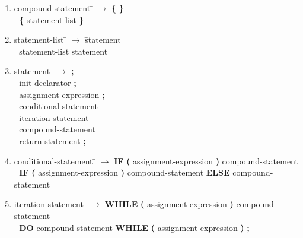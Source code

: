 \begin{enumerate}
\item \begin{tabbing} compound-statement \= $\rightarrow$ \= \textbf{\{} \textbf{\}} \\
	\> \hspace*{0.05cm} | \> \textbf{\{} statement-list \textbf{\}} \\
\end{tabbing}

\item \begin{tabbing} statement-list \= $\rightarrow$ \= statement \\
	\> \hspace*{0.05cm} | \> statement-list statement
\end{tabbing}

\item \begin{tabbing} statement \= $\rightarrow$ \= \textbf{;} \\
	\> \hspace*{0.05cm} | \> init-declarator \textbf{;} \\
	\> \hspace*{0.05cm} | \> assignment-expression \textbf{;} \\
	\> \hspace*{0.05cm} | \> conditional-statement \\
	\> \hspace*{0.05cm} | \> iteration-statement \\
	\> \hspace*{0.05cm} | \> compound-statement \\
	\> \hspace*{0.05cm} | \> return-statement \textbf{;} \\
\end{tabbing}

\item \begin{tabbing} conditional-statement \= $\rightarrow$ \= \textbf{IF} \textbf{(} assignment-expression \textbf{)} compound-statement \\
	\> \hspace*{0.05cm} | \> \textbf{IF} \textbf{(} assignment-expression \textbf{)} compound-statement \textbf{ELSE} compound-statement \\
\end{tabbing}

\item \begin{tabbing} iteration-statement \= $\rightarrow$ \= \textbf{WHILE} \textbf{(} assignment-expression \textbf{)} compound-statement \\
	\> \hspace*{0.05cm} | \> \textbf{DO} compound-statement \textbf{WHILE} \textbf{(} assignment-expression \textbf{)} \textbf{;} \\
\end{tabbing}


\end{enumerate}
